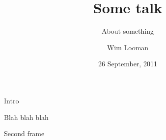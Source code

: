\documentclass[xcolor=dvipsnames]{beamer}
\author{Wim Looman}
\title{Some talk}
\subtitle{About something}
\institute[UC]
{
  Department of Electrical Engineering\\
  University of Canterbury\\
  New Zealand
}
\date{26 September, 2011}
\begin{document}
  \begin{frame}[plain]
    \titlepage
  \end{frame}

  \begin{frame}{Intro}

    Blah blah blah

  \end{frame}

  \begin{frame}{Second frame}

  \end{frame}
\end{document}

